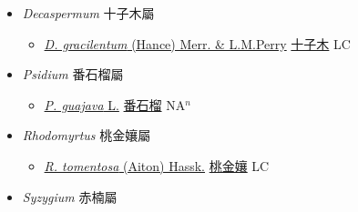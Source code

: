 
  \begin{itemize}
 \item[] \textit{Decaspermum} 十子木屬
                    
  \begin{itemize}
        \item[] \href{http://www.theplantlist.org/tpl1.1/search?q=Decaspermum+gracilentum}{\textit{D. gracilentum} (Hance) Merr. \& L.M.Perry}   \href{\detokenize{http://taibnet.sinica.edu.tw/chi/taibnet_species_list.php?T2=十子木&T2_new_value=true&fr=y}}{十子木} LC
  \end{itemize}
 \item[] \textit{Psidium} 番石榴屬
                    
  \begin{itemize}
        \item[] \href{http://www.theplantlist.org/tpl1.1/search?q=Psidium+guajava}{\textit{P. guajava} L.}   \href{\detokenize{http://taibnet.sinica.edu.tw/chi/taibnet_species_list.php?T2=番石榴&T2_new_value=true&fr=y}}{番石榴} NA$^n$
  \end{itemize}
 \item[] \textit{Rhodomyrtus} 桃金孃屬
                    
  \begin{itemize}
        \item[] \href{http://www.theplantlist.org/tpl1.1/search?q=Rhodomyrtus+tomentosa}{\textit{R. tomentosa} (Aiton) Hassk.}   \href{\detokenize{http://taibnet.sinica.edu.tw/chi/taibnet_species_list.php?T2=桃金孃&T2_new_value=true&fr=y}}{桃金孃} LC
  \end{itemize}
 \item[] \textit{Syzygium} 赤楠屬
                    

\end{itemize}
